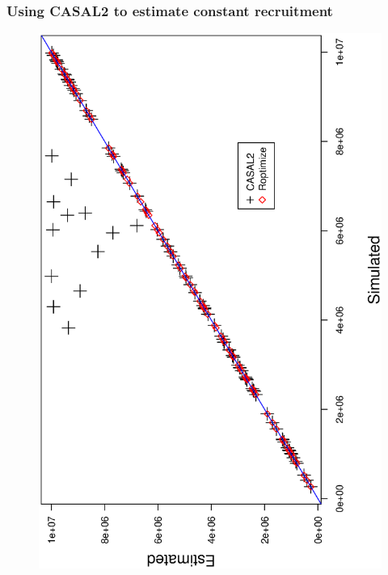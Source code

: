 \documentclass{beamer}
\begin{document}
\begin{frame}
\frametitle{Using CASAL2 to estimate constant recruitment}

\begin{figure}
  \includegraphics[scale=0.38, angle=-90]{../../TestCASAL2_withSimulatedData/StockDescriptionInNumbers/EstimateSingleConstantRecruitment/ByPassingInitialAbundancesToCASAL2/Results/Graphics/SimVsEst2.ps}
  \end{figure}

\end{frame}
\end{document}
